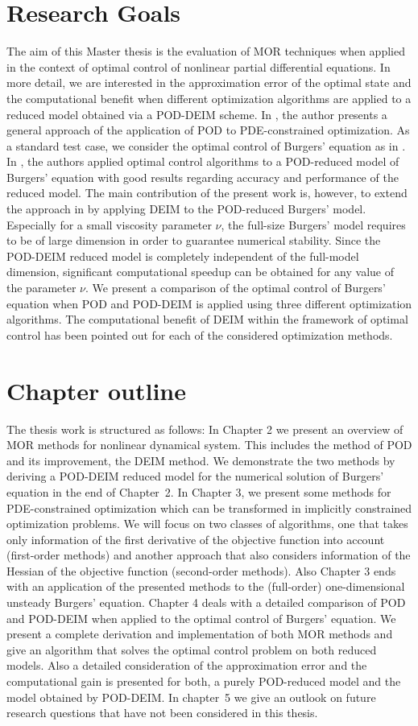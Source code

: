 \section{Research Goals}
The aim of this Master thesis is the evaluation of MOR techniques when applied in the context of optimal control of nonlinear partial differential equations. In more detail, we are interested in the approximation error of the optimal state and the computational benefit when different optimization algorithms are applied to a reduced model obtained via a POD-DEIM scheme. In \cite{V08}, the author presents a general approach of the application of POD to PDE-constrained optimization. As a standard test case, we consider the optimal control of Burgers' equation as in \cite{H08,RK03}. In \cite{KV99}, the authors applied optimal control algorithms to a POD-reduced model of Burgers' equation with good results regarding accuracy and performance of the reduced model. The main contribution of the present work is, however, to extend the approach in \cite{KV99} by applying DEIM to the POD-reduced Burgers' model. Especially for a small viscosity parameter $\nu$, the full-size Burgers' model requires to be of large dimension in order to guarantee numerical stability. Since the POD-DEIM reduced model is completely independent of the full-model dimension, significant computational speedup can be obtained for any value of the parameter $\nu$. We present a comparison of the optimal control of Burgers' equation when POD and POD-DEIM is applied using three different optimization algorithms. The computational benefit of DEIM within the framework of optimal control has been pointed out for each of the considered optimization methods.
\section{Chapter outline}
The thesis work is structured as follows: In Chapter 2 we present an overview of MOR methods for nonlinear dynamical system. This includes the method of POD and its improvement, the DEIM method. We demonstrate the two methods by deriving a POD-DEIM reduced model for the numerical solution of Burgers' equation in the end of \mbox{Chapter 2}. In Chapter 3, we present some methods for PDE-constrained optimization which can be transformed in implicitly constrained optimization problems. We will focus on two classes of algorithms, one that takes only information of the first derivative of the objective function into account (first-order methods) and another approach that also considers information of the Hessian of the objective function (second-order methods). Also Chapter 3 ends with an application of the presented methods to the (full-order) one-dimensional unsteady Burgers' equation. Chapter 4 deals with a detailed comparison of POD and POD-DEIM when applied to the optimal control of Burgers' equation. We present a complete derivation and implementation of both MOR methods and give an algorithm that solves the optimal control problem on both reduced models. Also a detailed consideration of the approximation error and the computational gain is presented for both, a purely POD-reduced model and the model obtained by POD-DEIM. In \mbox{chapter 5} we give an outlook on future research questions that have not been considered in this thesis. 